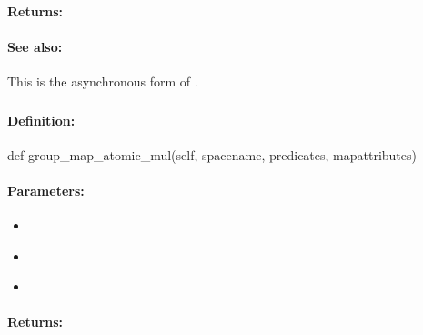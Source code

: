 \paragraph{Returns:}


\paragraph{See also:}  This is the asynchronous form of .

\pagebreak
\subsubsection{}
\label{api:python:group_map_atomic_mul}


\paragraph{Definition:}
\begin{pythoncode}
def group_map_atomic_mul(self, spacename, predicates, mapattributes)
\end{pythoncode}

\paragraph{Parameters:}
\begin{itemize}[noitemsep]
\item {}\\

\item {}\\

\item {}\\

\end{itemize}

\paragraph{Returns:}


